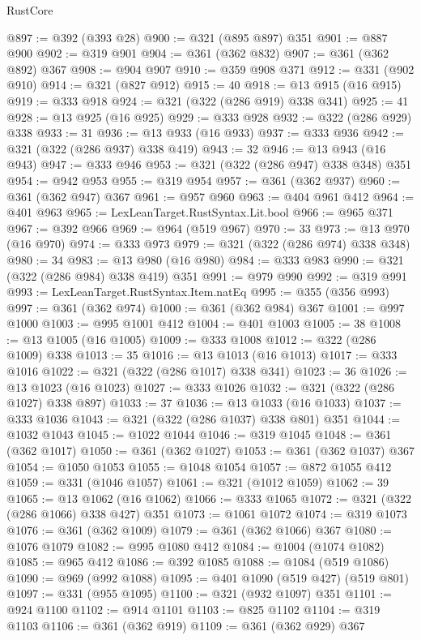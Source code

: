\begin{lexlean}{RustCore}
\begin{coremodule}
@897 := @392 (@393 @28)
@900 := @321 (@895 @897) @351
@901 := @887 @900
@902 := @319 @901
@904 := @361 (@362 @832)
@907 := @361 (@362 @892) @367
@908 := @904 @907
@910 := @359 @908 @371
@912 := @331 (@902 @910)
@914 := @321 (@827 @912)
@915 := 40
@918 := @13 @915 (@16 @915)
@919 := @333 @918
@924 := @321 (@322 (@286 @919) @338 @341)
@925 := 41
@928 := @13 @925 (@16 @925)
@929 := @333 @928
@932 := @322 (@286 @929) @338
@933 := 31
@936 := @13 @933 (@16 @933)
@937 := @333 @936
@942 := @321 (@322 (@286 @937) @338 @419)
@943 := 32
@946 := @13 @943 (@16 @943)
@947 := @333 @946
@953 := @321 (@322 (@286 @947) @338 @348) @351
@954 := @942 @953
@955 := @319 @954
@957 := @361 (@362 @937)
@960 := @361 (@362 @947) @367
@961 := @957 @960
@963 := @404 @961 @412
@964 := @401 @963
@965 := LexLeanTarget.RustSyntax.Lit.bool
@966 := @965 @371
@967 := @392 @966
@969 := @964 (@519 @967)
@970 := 33
@973 := @13 @970 (@16 @970)
@974 := @333 @973
@979 := @321 (@322 (@286 @974) @338 @348)
@980 := 34
@983 := @13 @980 (@16 @980)
@984 := @333 @983
@990 := @321 (@322 (@286 @984) @338 @419) @351
@991 := @979 @990
@992 := @319 @991
@993 := LexLeanTarget.RustSyntax.Item.natEq
@995 := @355 (@356 @993)
@997 := @361 (@362 @974)
@1000 := @361 (@362 @984) @367
@1001 := @997 @1000
@1003 := @995 @1001 @412
@1004 := @401 @1003
@1005 := 38
@1008 := @13 @1005 (@16 @1005)
@1009 := @333 @1008
@1012 := @322 (@286 @1009) @338
@1013 := 35
@1016 := @13 @1013 (@16 @1013)
@1017 := @333 @1016
@1022 := @321 (@322 (@286 @1017) @338 @341)
@1023 := 36
@1026 := @13 @1023 (@16 @1023)
@1027 := @333 @1026
@1032 := @321 (@322 (@286 @1027) @338 @897)
@1033 := 37
@1036 := @13 @1033 (@16 @1033)
@1037 := @333 @1036
@1043 := @321 (@322 (@286 @1037) @338 @801) @351
@1044 := @1032 @1043
@1045 := @1022 @1044
@1046 := @319 @1045
@1048 := @361 (@362 @1017)
@1050 := @361 (@362 @1027)
@1053 := @361 (@362 @1037) @367
@1054 := @1050 @1053
@1055 := @1048 @1054
@1057 := @872 @1055 @412
@1059 := @331 (@1046 @1057)
@1061 := @321 (@1012 @1059)
@1062 := 39
@1065 := @13 @1062 (@16 @1062)
@1066 := @333 @1065
@1072 := @321 (@322 (@286 @1066) @338 @427) @351
@1073 := @1061 @1072
@1074 := @319 @1073
@1076 := @361 (@362 @1009)
@1079 := @361 (@362 @1066) @367
@1080 := @1076 @1079
@1082 := @995 @1080 @412
@1084 := @1004 (@1074 @1082)
@1085 := @965 @412
@1086 := @392 @1085
@1088 := @1084 (@519 @1086)
@1090 := @969 (@992 @1088)
@1095 := @401 @1090 (@519 @427) (@519 @801)
@1097 := @331 (@955 @1095)
@1100 := @321 (@932 @1097) @351
@1101 := @924 @1100
@1102 := @914 @1101
@1103 := @825 @1102
@1104 := @319 @1103
@1106 := @361 (@362 @919)
@1109 := @361 (@362 @929) @367

\end{coremodule}
\end{lexlean}
